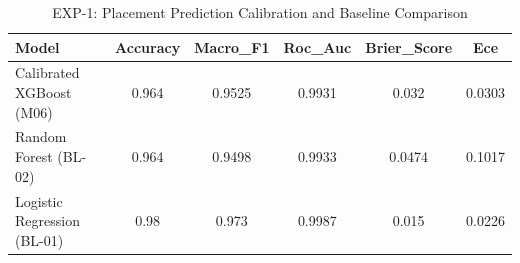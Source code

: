 \begin{table}[htbp]
\centering
\caption{EXP-1: Placement Prediction Calibration and Baseline Comparison}
\label{tab:exp1_results}
\begin{tabular}{lccccc}
\toprule
Model & Accuracy & Macro\_F1 & Roc\_Auc & Brier\_Score & Ece \\
\midrule
Calibrated XGBoost (M06) & 0.964 & 0.9525 & 0.9931 & 0.032 & 0.0303 \\
Random Forest (BL-02) & 0.964 & 0.9498 & 0.9933 & 0.0474 & 0.1017 \\
Logistic Regression (BL-01) & 0.98 & 0.973 & 0.9987 & 0.015 & 0.0226 \\
\bottomrule
\end{tabular}
\end{table}
